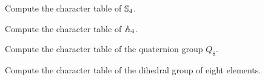 \begin{example}


%
%
%            
%            
%
%
\end{example}

\begin{exercise}
    Compute the character table of $\mathbb{S}_4$. 
\end{exercise}

\begin{exercise}
    Compute the character table of $\mathbb{A}_4$. 
\end{exercise}

\begin{exercise}
    Compute the character table of the quaternion group $Q_8$.
\end{exercise}

\begin{exercise}
    Compute the character table of the 
    dihedral group of eight elements. 
\end{exercise}

